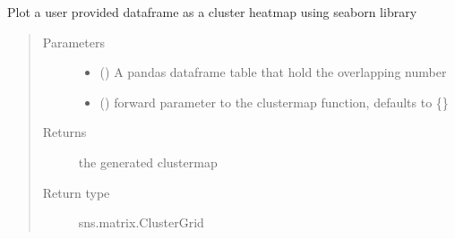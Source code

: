 \documentclass[letterpaper,10pt,english]{sphinxmanual}
\begin{document}
\begin{fulllineitems}
\label{\detokenize{IPTK.Visualization:IPTK.Visualization.vizTools.plot_overlap_heatmap}}
Plot a user provided dataframe as a cluster heatmap using seaborn library
\begin{quote}\begin{description}
\item[{Parameters}] \leavevmode\begin{itemize}
\item {} 
 () \textendash{} A pandas dataframe table that hold the overlapping number

\item {} 
 (\sphinxstyleliteralemphasis{\sphinxupquote{, }}) \textendash{} forward parameter to the clustermap function, defaults to \{\}

\end{itemize}

\item[{Returns}] \leavevmode
the generated clustermap

\item[{Return type}] \leavevmode
sns.matrix.ClusterGrid

\end{description}\end{quote}

\end{fulllineitems}

\end{document}
